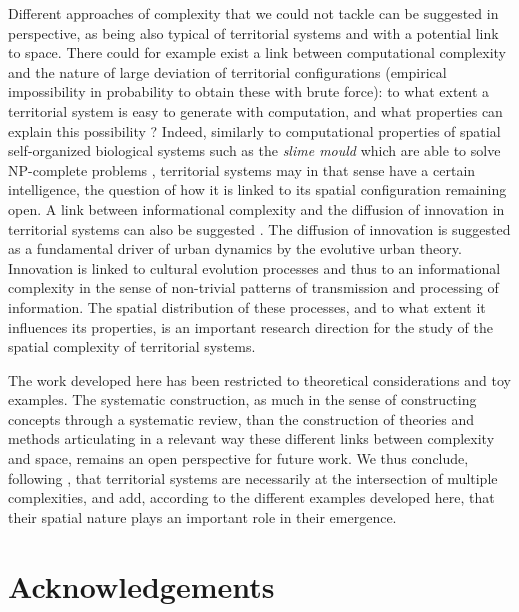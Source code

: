 \documentclass[11pt]{article}
\begin{document}
Different approaches of complexity that we could not tackle can be suggested in perspective, as being also typical of territorial systems and with a potential link to space. There could for example exist a link between computational complexity and the nature of large deviation of territorial configurations (empirical impossibility in probability to obtain these with brute force): to what extent a territorial system is easy to generate with computation, and what properties can explain this possibility ? Indeed, similarly to computational properties of spatial self-organized biological systems such as the \emph{slime mould} which are able to solve NP-complete problems \citep{zhu2013amoeba}, territorial systems may in that sense have a certain intelligence, the question of how it is linked to its spatial configuration remaining open. A link between informational complexity and the diffusion of innovation in territorial systems can also be suggested \citep{favaro2011gibrat}. The diffusion of innovation is suggested as a fundamental driver of urban dynamics by the evolutive urban theory. Innovation is linked to cultural evolution processes \citep{Mesoudi25072017} and thus to an informational complexity in the sense of non-trivial patterns of transmission and processing of information. The spatial distribution of these processes, and to what extent it influences its properties, is an important research direction for the study of the spatial complexity of territorial systems.


The work developed here has been restricted to theoretical considerations and toy examples. The systematic construction, as much in the sense of constructing concepts through a systematic review, than the construction of theories and methods articulating in a relevant way these different links between complexity and space, remains an open perspective for future work. We thus conclude, following \cite{raimbault2017complexity}, that territorial systems are necessarily at the intersection of multiple complexities, and add, according to the different examples developed here, that their spatial nature plays an important role in their emergence.







\section*{Acknowledgements}
\end{document}
